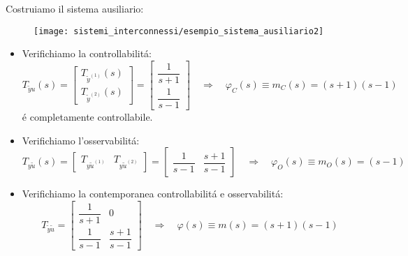 \documentclass[../main.tex]{subfiles}
\begin{document}
			Costruiamo il sistema ausiliario:
			\begin{figure}[h!]
				\centering\texttt{[image: sistemi\_interconnessi/esempio\_sistema\_ausiliario2]}
			\end{figure}
			\begin{itemize}
				\item 
					Verifichiamo la controllabilit\'a:
					\[
						T_{\tilde yu}(s) =
						\begin{bmatrix}
							T_{\tilde y^{(1)}}(s)\\
							T_{\tilde y^{(2)}}(s)
						\end{bmatrix} =
						\begin{bmatrix}
							\dfrac{1}{s+1}\\
							\dfrac{1}{s-1}
						\end{bmatrix}
						\quad\Rightarrow\quad
						\varphi_C(s) \equiv m_C(s) = (s+1)(s-1)
					\]
					\'e completamente controllabile.
				\item 
					Verifichiamo l'osservabilit\'a:
					\[
						T_{y \tilde u}(s) = 
						\begin{bmatrix}
							T_{y \tilde u^{(1)}} & T_{y \tilde u^{(2)}}
						\end{bmatrix} =
						\begin{bmatrix}
							\dfrac{1}{s-1} & \dfrac{s+1}{s-1}
						\end{bmatrix}
						\quad\Rightarrow\quad
						\varphi_O(s) \equiv m_O(s) = (s-1)
					\]
				\item 
					Verifichiamo la contemporanea controllabilit\'a e osservabilit\'a:
					\[
						T_{\tilde y \tilde u} =
						\begin{bmatrix}
							\dfrac{1}{s+1} & 0\\
							\dfrac{1}{s-1} & \dfrac{s+1}{s-1}
						\end{bmatrix}
						\quad\Rightarrow\quad
						\varphi(s) \equiv m(s) = (s+1)(s-1)
					\]
			\end{itemize}
		
\end{document}
